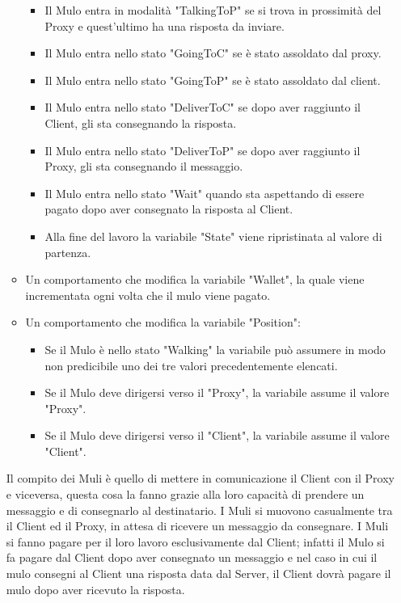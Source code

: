 \documentclass[13pt,a4paper]{article}
\begin{document}
\begin{itemize}
\begin{itemize}
\begin{itemize}
				\item Il Mulo entra in modalità "TalkingToP" se si trova in prossimità del Proxy e quest'ultimo ha una risposta da inviare.
				\item Il Mulo entra nello stato "GoingToC" se è stato assoldato dal proxy.
				\item Il Mulo entra nello stato "GoingToP" se è stato assoldato dal client.
				\item Il Mulo entra nello stato "DeliverToC" se dopo aver raggiunto il Client, gli sta consegnando la risposta.
				\item Il Mulo entra nello stato "DeliverToP" se dopo aver raggiunto il Proxy, gli sta  consegnando il messaggio.
				\item Il Mulo entra nello stato "Wait" quando sta aspettando di essere pagato dopo aver consegnato la risposta al Client.
				\item Alla fine del lavoro la variabile "State" viene ripristinata al valore di partenza.
			\end{itemize}
			\item Un comportamento che modifica la variabile "Wallet", la quale viene incrementata ogni volta che il mulo viene pagato.
			\item Un comportamento che modifica la variabile "Position":
			\begin{itemize}
				\item Se il Mulo è nello stato "Walking" la variabile può assumere in modo non predicibile uno dei tre valori precedentemente elencati. 
				\item Se il Mulo deve dirigersi verso il "Proxy", la variabile assume il valore "Proxy".
				\item Se il Mulo deve dirigersi verso il "Client", la variabile assume il valore "Client".
			\end{itemize}
		\end{itemize}
		Il compito dei Muli è  quello di mettere in comunicazione il Client con il Proxy e viceversa, questa cosa la fanno grazie alla loro capacità di prendere un messaggio e di consegnarlo al destinatario. I Muli si muovono casualmente tra il Client ed il Proxy, in attesa di ricevere un messaggio da consegnare. I Muli si fanno pagare per il loro lavoro esclusivamente dal Client; infatti il Mulo si fa pagare dal Client dopo aver consegnato  un messaggio e nel caso in cui il mulo consegni al Client una risposta data dal Server, il Client dovrà pagare il mulo dopo aver ricevuto la risposta.
		

\end{itemize}
\end{document}
